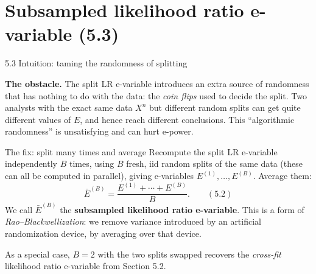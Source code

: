 \documentclass[aspectratio=169,10pt]{beamer}
\begin{document}
\section{Subsampled likelihood ratio e-variable (5.3)}

\begin{frame}{5.3 Intuition: taming the randomness of splitting}

  \textbf{The obstacle.} The split LR e-variable introduces an extra
  source of randomness that has nothing to do with the data: the
  \emph{coin flips} used to decide the split. Two analysts with the
  exact same data $X^n$ but different random splits can get quite
  different values of $E$, and hence reach different conclusions. This
  ``algorithmic randomness'' is unsatisfying and can hurt e-power.

  \begin{block}{The fix: split many times and average}
    Recompute the split LR e-variable independently $B$ times, using
    $B$ fresh, iid random splits of the same data (these can all be
    computed in parallel), giving e-variables $E^{(1)},\ldots,E^{(B)}$.
    Average them:
    $$ \bar E^{(B)} = \frac{E^{(1)} + \cdots + E^{(B)}}{B}. \qquad (5.2)$$
    We call $\bar E^{(B)}$ the \textbf{subsampled likelihood ratio
    e-variable}. This is a form of \emph{Rao--Blackwellization}: we
    remove variance introduced by an artificial randomization device,
    by averaging over that device.
  \end{block}

  As a special case, $B=2$ with the two splits swapped recovers the
  \emph{cross-fit} likelihood ratio e-variable from Section 5.2.

\end{frame}
\end{document}
